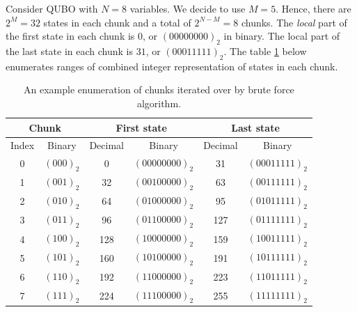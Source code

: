 \begin{example}
  Consider QUBO with $N=8$ variables. We decide to use $M=5$. Hence, there are
  $2^{M}=32$ states in each chunk and a total of $2^{N-M}=8$ chunks. The
  \emph{local} part of the first state in each chunk is $0$, or $(00000000)_{2}$
  in binary. The local part of the last state in each chunk is $31$, or
  $(00011111)_{2}$. The table \ref{tab:chunks} below enumerates ranges of
  combined integer representation of states in each chunk.
  \begin{table}[ht!]
    \centering
    \begin{tabular}{c|c|c|c|c|c}
      \hline
      \multicolumn{2}{c|}{Chunk}       &
      \multicolumn{2}{c|}{First state} &
      \multicolumn{2}{c}{Last state}                                                                         \\
      \hline
      Index                            & Binary    & Decimal & Binary           & Decimal & Binary           \\
      \hline
      0                                & $(000)_2$ & 0       & $(00000000)_{2}$ & 31      & $(00011111)_{2}$ \\
      1                                & $(001)_2$ & 32      & $(00100000)_{2}$ & 63      & $(00111111)_{2}$ \\
      2                                & $(010)_2$ & 64      & $(01000000)_{2}$ & 95      & $(01011111)_{2}$ \\
      3                                & $(011)_2$ & 96      & $(01100000)_{2}$ & 127     & $(01111111)_{2}$ \\
      4                                & $(100)_2$ & 128     & $(10000000)_{2}$ & 159     & $(10011111)_{2}$ \\
      5                                & $(101)_2$ & 160     & $(10100000)_{2}$ & 191     & $(10111111)_{2}$ \\
      6                                & $(110)_2$ & 192     & $(11000000)_{2}$ & 223     & $(11011111)_{2}$ \\
      7                                & $(111)_2$ & 224     & $(11100000)_{2}$ & 255     & $(11111111)_{2}$ \\
      \hline
    \end{tabular}
    \caption{An example enumeration of chunks iterated over by brute force algorithm.}
    \label{tab:chunks}
  \end{table}

  \begin{table}{}

  \end{table}
\end{example}

